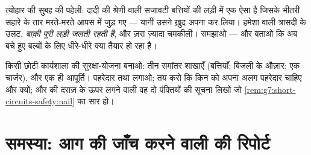 \begin{exercise}[$\star\star$]\label{exo:g7:short-circuits-safety:11}
त्योहार की सुबह की पहेली: दादी की श्रेणी वाली सजावटी बत्तियों की लड़ी
में एक  ऐसा है जिसके भीतरी सहारे के तार मरते-मरते आपस में जुड़ गए
--- यानी उसने ख़ुद अपना  कर लिया। हमेशा वाली त्रासदी के उलट,
\emph{बाक़ी पूरी लड़ी जलती रहती है}, और ज़रा ज़्यादा चमकीली। समझाओ ---
और बताओ कि अब बचे हुए बल्बों के लिए धीरे-धीरे क्या तैयार हो रहा है।
\end{exercise}

\begin{exercise}[$\star\star\star$]\label{exo:g7:short-circuits-safety:12}
किसी छोटी कार्यशाला की सुरक्षा-योजना बनाओ: तीन समांतर शाखाएँ
(बत्तियाँ; बिजली के औज़ार; एक  चार्जर), और एक ही आपूर्ति।
पहरेदार तथा  लगाओ; तय करो कि किन  को अपना अलग पहरेदार चाहिए
और क्यों; और  की दराज़ के ऊपर लगने वाली वह दो पंक्तियों की सूचना
लिखो जो \cref{rem:g7:short-circuits-safety:nail} का सार हो।
\end{exercise}

\section{समस्या: आग की जाँच करने वाली की रिपोर्ट}

